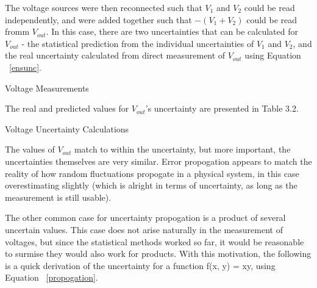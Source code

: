 \documentclass[journal]{IEEEtran}
\begin{document}
The voltage sources were then reconnected such that $V_1$ and $V_2$ could be
read independently, and were added together such that $-(V_1 + V_2)$ could be
read fromm $V_{out}$. In this case, there are two uncertainties that can be
calculated for $V_{out}$ - the statistical prediction from the individual
uncertainties of $V_1$ and $V_2$, and the real uncertainty calculated from
direct measurement of $V_{out}$ using Equation ~\ref{ensunc}.


\begin{table}[ht]
\centering
\caption{\normalsize{Voltage Measurements}}
\medskip
\caption{Table 3.1: Measurements of individual voltages and their sum in an
adder circuit.}
\end{table}

The real and predicted values for $V_{out}$'s uncertainty are presented in Table
3.2.

\begin{table}[ht]
\centering
\caption{\normalsize{Voltage Uncertainty Calculations}}
\medskip
\caption{Table 3.2: Measured and calculated uncertainties for the summed
voltage.}
\end{table}

The values of $V_{out}$ match to within the uncertainty, but more important, the
uncertainties themselves are very similar. Error propogation appears to match
the reality of how random fluctuations propogate in a physical system, in this
case overestimating slightly (which is alright in terms of uncertainty, as long
as the measurement is still usable).

The other common case for uncertainty propogation is a product of several
uncertain values. This case does not arise naturally in the measurement of
voltages, but since the statistical methods worked so far, it would be
reasonable to surmise they would also work for products. With this motivation,
the following is a quick derivation of the uncertainty for a function f(x, y) =
xy, using Equation ~\ref{propogation}.
\end{document}
